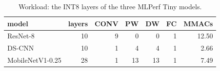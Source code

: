 \begin{table}[t]\centering\footnotesize
\caption{Workload: the INT8 layers of the three MLPerf Tiny models.}\label{tab:workload}
\begin{tabular}{@{}lrrrrrr@{}}\toprule
model & layers & CONV & PW & DW & FC & MMACs\\\midrule
ResNet-8 & 10 & 9 & 0 & 0 & 1 & 12.50 \\
DS-CNN & 10 & 1 & 4 & 4 & 1 & 2.66 \\
MobileNetV1-0.25 & 28 & 1 & 13 & 13 & 1 & 7.49 \\
\bottomrule\end{tabular}\end{table}
